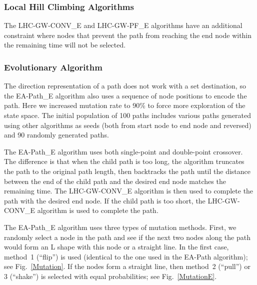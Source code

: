 \documentclass[letterpaper, 10 pt, conference]{ieeeconf}
\begin{document}
%

\subsubsection{Local Hill Climbing Algorithms}

The LHC-GW-CONV\_E and LHC-GW-PF\_E algorithms have an additional constraint where nodes that prevent the path from reaching the end node within the remaining time will not be selected.

\subsubsection{Evolutionary Algorithm}

The direction representation of a path does not work with a set destination, so the EA-Path\_E algorithm also uses a sequence of node positions to encode the path. Here we increased mutation rate to 90\% to force more exploration of the state space. The initial population of 100 paths includes various paths generated using other algorithms as seeds (both from start node to end node and reversed) and 90 randomly generated paths.

The EA-Path\_E algorithm uses both single-point and double-point crossover. The difference is that when the child path is too long, the algorithm truncates the path to the original path length, then backtracks the path until the distance between the end of the child path and the desired end node matches the remaining time. The LHC-GW-CONV\_E algorithm is then used to complete the path with the desired end node. If the child path is too short, the LHC-GW-CONV\_E algorithm is used to complete the path.

The EA-Path\_E algorithm uses three types of mutation methods. First, we randomly select a node in the path and see if the next two nodes along the path would form an L shape with this node or a straight line. In the first case, method~1 (``flip'') is used (identical to the one used in the EA-Path algorithm); see Fig.~\ref{Mutation}. If the nodes form a straight line, then method~2 (``pull'') or 3 (``shake'') is selected with equal probabilities; see Fig.~\ref{MutationE}.
\end{document}
